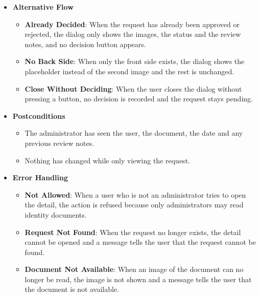 \begin{itemize}[leftmargin=1.6em,topsep=4pt,itemsep=3pt,parsep=0pt,label=$\bullet$]
\begin{itemize}[leftmargin=2.2em,topsep=2pt,itemsep=3pt,parsep=0pt,label=$\circ$]
            \item \textbf{Decide on a Pending Request}: When the request is pending, the dialog also shows a review notes box and the \textbf{Approve} and \textbf{Reject} buttons (see \textbf{Approve or Reject ID Verification}).
            \item \textbf{Close the Detail}: The user closes the dialog and returns to the list, where the row reflects the current status.
        \end{itemize}
    \item \textbf{Alternative Flow}
        \begin{itemize}[leftmargin=2.2em,topsep=2pt,itemsep=3pt,parsep=0pt,label=$\circ$]
            \item \textbf{Already Decided}: When the request has already been approved or rejected, the dialog only shows the images, the status and the review notes, and no decision button appears.
            \item \textbf{No Back Side}: When only the front side exists, the dialog shows the placeholder instead of the second image and the rest is unchanged.
            \item \textbf{Close Without Deciding}: When the user closes the dialog without pressing a button, no decision is recorded and the request stays pending.
        \end{itemize}
    \item \textbf{Postconditions}
        \begin{itemize}[leftmargin=2.2em,topsep=2pt,itemsep=3pt,parsep=0pt,label=$\circ$]
            \item The administrator has seen the user, the document, the date and any previous review notes.
            \item Nothing has changed while only viewing the request.
        \end{itemize}
    \item \textbf{Error Handling}
        \begin{itemize}[leftmargin=2.2em,topsep=2pt,itemsep=3pt,parsep=0pt,label=$\circ$]
            \item \textbf{Not Allowed}: When a user who is not an administrator tries to open the detail, the action is refused because only administrators may read identity documents.
            \item \textbf{Request Not Found}: When the request no longer exists, the detail cannot be opened and a message tells the user that the request cannot be found.
            \item \textbf{Document Not Available}: When an image of the document can no longer be read, the image is not shown and a message tells the user that the document is not available.

\end{itemize}
\end{itemize}
